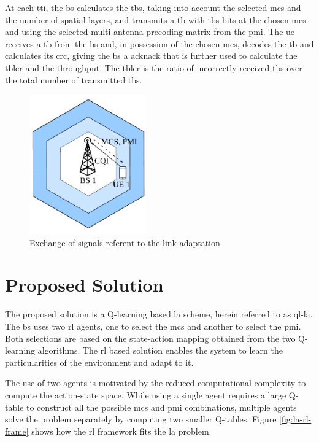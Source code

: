 At each \gls{tti}, the \gls{bs} calculates the \gls{tbs}, taking into account the selected \gls{mcs} and the number of spatial layers, and transmits a \gls{tb} with \gls{tbs} bits at the chosen \gls{mcs} and using the selected multi-antenna precoding matrix from the \gls{pmi}.
%
The \gls{ue} receives a \gls{tb} from the \gls{bs} and, in possession of the chosen \gls{mcs}, decodes the \gls{tb} and calculates its \gls{crc}, giving the \gls{bs} a \gls{acknack} that is further used to calculate the \gls{tbler} and the throughput.
%
The \gls{tbler} is the ratio of incorrectly received \gls{tb}s over the total number of transmitted \gls{tb}s.

\begin{figure}[!hb]
	\centerline{\includegraphics[width=50mm]{figures/chp_la/system-model-mateus.pdf}}
	\caption{Exchange of signals referent to the link adaptation}
	\label{fig:la-system-model}
\end{figure}


\section{Proposed Solution}
\label{sec:la-proposed}

The proposed solution is a Q-learning based \gls{la} scheme, herein referred to as \gls{ql-la}.
%
The \gls{bs} uses two \gls{rl} agents, one to select the \gls{mcs} and another to select the \gls{pmi}.
%
Both selections are based on the state-action mapping obtained from the two Q-learning algorithms.
%
The \gls{rl} based solution enables the system to learn the particularities of the environment and adapt to it.


The use of two agents is motivated by the reduced computational complexity to compute the action-state space.
%
While using a single agent requires a large Q-table to construct all the possible \gls{mcs} and \gls{pmi} combinations, multiple agents solve the problem separately by computing two smaller Q-tables.
%
Figure \ref{fig:la-rl-frame} shows how the \gls{rl} framework fits the \gls{la} problem.

